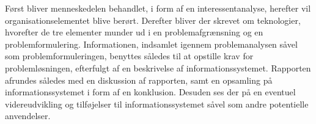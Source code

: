 Først bliver menneskedelen behandlet, i form af en interessentanalyse, herefter vil organisationselementet blive berørt.
Derefter bliver der skrevet om teknologier, hvorefter de tre elementer munder ud i en problemafgrænsning og en problemformulering.
Informationen, indsamlet igennem problemanalysen såvel som problemformuleringen, benyttes således til at opstille krav for problemløsningen, efterfulgt af en beskrivelse af informationssystemet. 
Rapporten afrundes således med en diskussion af rapporten, samt en opsamling på informationssystemet i form af en konklusion. Desuden ses der på en eventuel videreudvikling og tilføjelser til informationssystemet såvel som andre potentielle anvendelser.